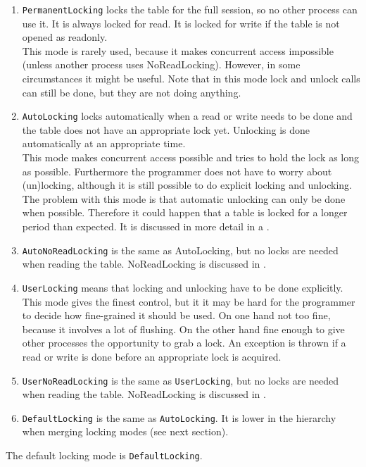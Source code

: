 \begin{enumerate}
\item \texttt{PermanentLocking} locks the table for
the full session, so no other process can use it. It is always
locked for read. It is locked for write if the table is not opened
as readonly.
\\This mode is rarely used, because it makes concurrent access
impossible (unless another process uses NoReadLocking).
However, in some circumstances it might
be useful. Note that in this mode lock and unlock calls can still be
done, but they are not doing anything.
\item \texttt{AutoLocking} locks automatically when a read or write needs
to be done and the table does not have an appropriate lock yet.
Unlocking is done automatically at an appropriate time.
\\This mode makes concurrent access possible and tries to hold the lock as
long as possible. Furthermore the programmer
does not have to worry about (un)locking, although it is still possible to
do explicit locking and unlocking.
\\The problem with this mode is that automatic unlocking can only
be done when possible. Therefore it
could happen that a table is locked for a longer period than expected.
It is discussed in more detail in a
.
\item \texttt{AutoNoReadLocking} is the same as AutoLocking, but no
locks are needed when reading the table. NoReadLocking is discussed in
.
\item \texttt{UserLocking} means that locking and unlocking have
to be done explicitly.
\\This mode gives the finest control, but it it may be hard for the
programmer to decide how fine-grained it should be used. On one hand
not too fine, because it involves a lot of flushing. On the other hand
fine enough to give other processes the opportunity to grab a lock.
An exception is thrown if a
read or write is done before an appropriate lock is acquired.
\item \texttt{UserNoReadLocking} is the same as \texttt{UserLocking}, but no
locks are needed when reading the table. NoReadLocking is discussed in
.
\item \texttt{DefaultLocking} is the same as \texttt{AutoLocking}. It is lower
in the hierarchy when merging locking modes (see next section).
\end{enumerate}
The default locking mode is \texttt{DefaultLocking}.

